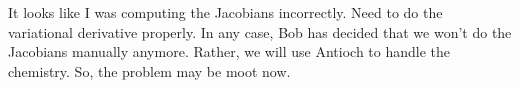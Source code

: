It looks like I was computing the Jacobians incorrectly.  Need to do the variational derivative properly.  In any case, Bob has decided that we won't do the Jacobians manually anymore.  Rather, we will use Antioch to handle the chemistry.  So, the problem may be moot now.
%
%
%




